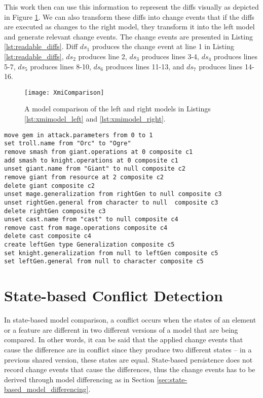 This work then can use this information to represent the diffs visually as depicted in Figure \ref{fig:xmi_comparison}. We can also transform these diffs into change events that if the diffs are executed as changes to the right model, they transform it into the left model and generate relevant change events. The change events are presented in Listing \ref{lst:readable_diffs}. Diff $ds_{1}$ produces the change event at line 1 in Listing \ref{lst:readable_diffs}, $ds_{2}$ produces line 2, $ds_{3}$ produces lines 3-4, $ds_{4}$ produces lines 5-7, $ds_{5}$ produces lines 8-10, $ds_{6}$ produces lines 11-13, and $ds_{7}$ produces lines 14-16.

\begin{figure}[ht]
  \texttt{[image: XmiComparison]}
  \caption{A model comparison of the left and right models in Listings \ref{lst:xmimodel_left} and \ref{lst:xmimodel_right}.}
  \label{fig:xmi_comparison}
\end{figure}

\vspace{-20pt}
\begin{lstlisting}[firstnumber=1,style=eol,caption={The identified diffs presented as change events.},label=lst:readable_diffs]
move gem in attack.parameters from 0 to 1
set troll.name from "Orc" to "Ogre"
remove smash from giant.operations at 0 composite c1
add smash to knight.operations at 0 composite c1
unset giant.name from "Giant" to null composite c2
remove giant from resource at 2 composite c2
delete giant composite c2
unset mage.generalization from rightGen to null composite c3
unset rightGen.general from character to null  composite c3
delete rightGen composite c3
unset cast.name from "cast" to null composite c4
remove cast from mage.operations composite c4
delete cast composite c4
create leftGen type Generalization composite c5
set knight.generalization from null to leftGen composite c5
set leftGen.general from null to character composite c5
\end{lstlisting}

\section{State-based Conflict Detection}
\label{sec:emfcompare_conflict_detection}
In state-based model comparison, a conflict occurs when the states of an element or a feature are different in two different versions of a model that are being compared. In other words, it can be said that the applied change events that cause the difference are in conflict since they produce two different states -- in a previous shared version, these states are equal. State-based persistence does not record change events that cause the differences, thus the change events has to be derived through model differencing as in Section \ref{sec:state-based_model_differencing}. 

